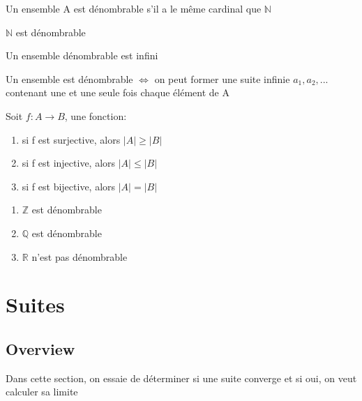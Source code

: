 \documentclass{article}
\begin{document}
\begin{definition}[Dénombrabilité]
    Un ensemble A est dénombrable s'il a le même cardinal que $\mathbb{N}$
\end{definition}

\begin{remark}
\item $\mathbb{N}$ est dénombrable
\item Un ensemble dénombrable est infini
\item Un ensemble est dénombrable $\Longleftrightarrow$ on peut former une suite
    infinie $a_1, a_2, ...$ contenant une et une seule fois chaque élément de A
\end{remark}

\begin{theorem}
    Soit $ f:A \to B$, une fonction:
    \begin{enumerate}
	\item si f est surjective, alors $|A| \geq |B|$
	\item si f est injective, alors $|A| \leq |B|$
	\item si f est bijective, alors $|A| = |B|$
    \end{enumerate}
\end{theorem}

\begin{proposition}
    \begin{enumerate}
	\item $\mathbb{Z}$ est dénombrable
    	\item $\mathbb{Q}$ est dénombrable
    	\item $\mathbb{R}$ n'est pas dénombrable
    \end{enumerate}
\end{proposition}

\begin{remark}
\end{remark}

\pagebreak
\section{Suites}

\subsection{Overview}

Dans cette section, on essaie de déterminer si une suite converge et si oui,
on veut calculer sa limite
\end{document}

